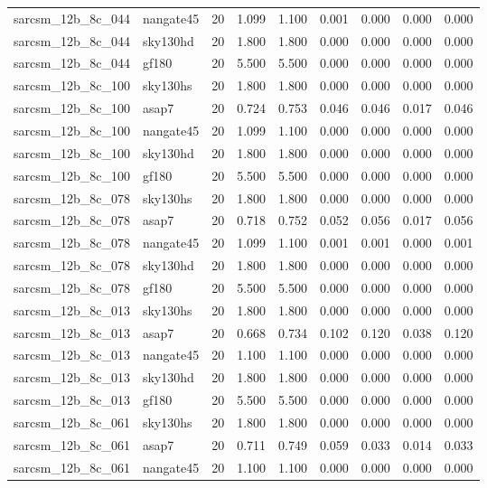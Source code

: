 \begin{tabular}{llrrrrrrr}
sarcsm\_12b\_8c\_044 & nangate45 & 20 & 1.099 & 1.100 & 0.001 & 0.000 & 0.000 & 0.000 \\
sarcsm\_12b\_8c\_044 & sky130hd & 20 & 1.800 & 1.800 & 0.000 & 0.000 & 0.000 & 0.000 \\
sarcsm\_12b\_8c\_044 & gf180 & 20 & 5.500 & 5.500 & 0.000 & 0.000 & 0.000 & 0.000 \\
sarcsm\_12b\_8c\_100 & sky130hs & 20 & 1.800 & 1.800 & 0.000 & 0.000 & 0.000 & 0.000 \\
sarcsm\_12b\_8c\_100 & asap7 & 20 & 0.724 & 0.753 & 0.046 & 0.046 & 0.017 & 0.046 \\
sarcsm\_12b\_8c\_100 & nangate45 & 20 & 1.099 & 1.100 & 0.000 & 0.000 & 0.000 & 0.000 \\
sarcsm\_12b\_8c\_100 & sky130hd & 20 & 1.800 & 1.800 & 0.000 & 0.000 & 0.000 & 0.000 \\
sarcsm\_12b\_8c\_100 & gf180 & 20 & 5.500 & 5.500 & 0.000 & 0.000 & 0.000 & 0.000 \\
sarcsm\_12b\_8c\_078 & sky130hs & 20 & 1.800 & 1.800 & 0.000 & 0.000 & 0.000 & 0.000 \\
sarcsm\_12b\_8c\_078 & asap7 & 20 & 0.718 & 0.752 & 0.052 & 0.056 & 0.017 & 0.056 \\
sarcsm\_12b\_8c\_078 & nangate45 & 20 & 1.099 & 1.100 & 0.001 & 0.001 & 0.000 & 0.001 \\
sarcsm\_12b\_8c\_078 & sky130hd & 20 & 1.800 & 1.800 & 0.000 & 0.000 & 0.000 & 0.000 \\
sarcsm\_12b\_8c\_078 & gf180 & 20 & 5.500 & 5.500 & 0.000 & 0.000 & 0.000 & 0.000 \\
sarcsm\_12b\_8c\_013 & sky130hs & 20 & 1.800 & 1.800 & 0.000 & 0.000 & 0.000 & 0.000 \\
sarcsm\_12b\_8c\_013 & asap7 & 20 & 0.668 & 0.734 & 0.102 & 0.120 & 0.038 & 0.120 \\
sarcsm\_12b\_8c\_013 & nangate45 & 20 & 1.100 & 1.100 & 0.000 & 0.000 & 0.000 & 0.000 \\
sarcsm\_12b\_8c\_013 & sky130hd & 20 & 1.800 & 1.800 & 0.000 & 0.000 & 0.000 & 0.000 \\
sarcsm\_12b\_8c\_013 & gf180 & 20 & 5.500 & 5.500 & 0.000 & 0.000 & 0.000 & 0.000 \\
sarcsm\_12b\_8c\_061 & sky130hs & 20 & 1.800 & 1.800 & 0.000 & 0.000 & 0.000 & 0.000 \\
sarcsm\_12b\_8c\_061 & asap7 & 20 & 0.711 & 0.749 & 0.059 & 0.033 & 0.014 & 0.033 \\
sarcsm\_12b\_8c\_061 & nangate45 & 20 & 1.100 & 1.100 & 0.000 & 0.000 & 0.000 & 0.000 \\

\end{tabular}
